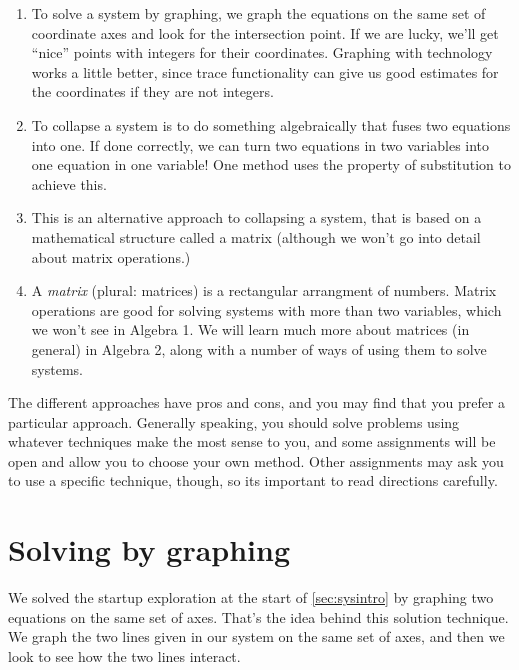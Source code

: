 \begin{enumerate}
\item {} To solve a system by graphing, we graph the equations on the same set of coordinate axes and look for the intersection point. If we are lucky, we'll get ``nice'' points with integers for their coordinates. Graphing with technology works a little better, since trace functionality can give us good estimates for the coordinates if they are not integers.

\item {} To collapse a system is to do something algebraically that fuses two equations into one. If done correctly, we can turn two equations in two variables into one equation in one variable! One method uses the property of substitution to achieve this.

\item {} This is an alternative approach to collapsing a system, that is based on a mathematical structure called a matrix (although we won't go into detail about matrix operations.)

\item {} A \textit{matrix} (plural: matrices) is a rectangular arrangment of numbers. Matrix operations are good for solving systems with more than two variables, which we won't see in Algebra 1. We will learn much more about matrices (in general) in Algebra 2, along with a number of ways of using them to solve systems.
\end{enumerate}

The different approaches have pros and cons, and you may find that you prefer a particular approach. Generally speaking, you should solve problems using whatever techniques make the most sense to you, and some assignments will be open and allow you to choose your own method. Other assignments may ask you to use a specific technique, though, so its important to read directions carefully.

\section{Solving by graphing}
\label{sec:sysgraphing}

We solved the startup exploration at the start of \cref{sec:sysintro} by graphing two equations on the same set of axes. That's the idea behind this solution technique. We graph the two lines given in our system on the same set of axes, and then we look to see how the two lines interact.

